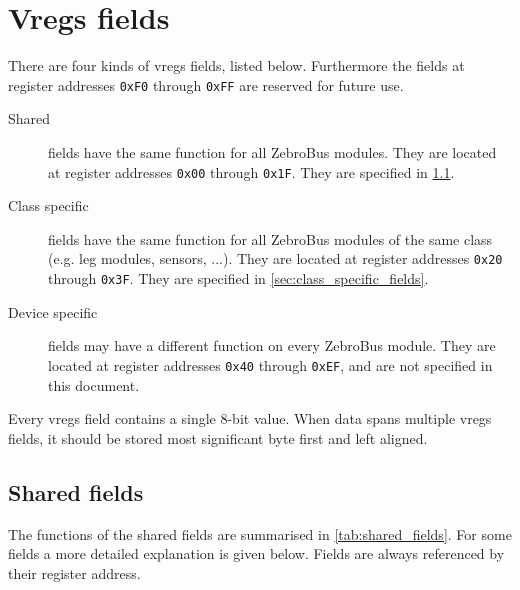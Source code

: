 \section{Vregs fields}
There are four kinds of vregs fields, listed below.
Furthermore the fields at register addresses \verb|0xF0| through \verb|0xFF| are reserved for future use.

\begin{description}
\item[Shared]
    fields have the same function for all ZebroBus modules.
    They are located at register addresses \verb|0x00| through \verb|0x1F|.
    They are specified in \cref{sec:shared_fields}.
    
\item[Class specific]
    fields have the same function for all ZebroBus modules of the same class (e.g. leg modules, sensors, ...).
    They are located at register addresses \verb|0x20| through \verb|0x3F|.
    They are specified in  \cref{sec:class_specific_fields}.
    
\item[Device specific]
    fields may have a different function on every ZebroBus module.
    They are located at register addresses \verb|0x40| through \verb|0xEF|,
    and are not specified in this document.

\end{description}

Every vregs field contains a single 8-bit value.
When data spans multiple vregs fields, it should be stored most significant byte first and left aligned.
\subsection{Shared fields}\label{sec:shared_fields}
The functions of the shared fields are summarised in \cref{tab:shared_fields}.
For some fields a more detailed explanation is given below. Fields are always referenced by their register address.

